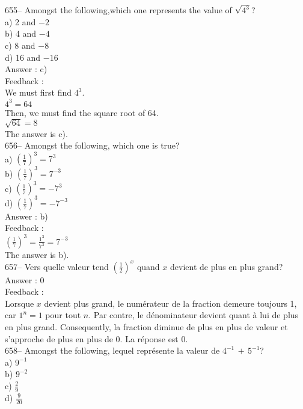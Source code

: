 \documentclass[letterpaper, 12pt]{article}
\begin{document}
655-- Amongst the following,which one represents the value of
$\sqrt{4^{3}}$?\\
a) 2 and $-2$\\
b) 4 and $-4$\\
c) 8 and $-8$\\
d) 16 and $-16$\\

Answer : c)\\

Feedback : \\
We must first find $4^{3}$.\\
$4^{3}=64$\\
Then, we must find the square root of 64.\\
$\sqrt{64}= 8$\\
The answer is c).\\

656-- Amongst the following, which one is true?\\
a) $(\frac{1}{7})^{3}=7^{3}$\\[2mm]
b) $(\frac{1}{7})^{3}=7^{-3}$\\[2mm]
c) $(\frac{1}{7})^{3}=-7^{3}$\\[2mm]
d) $(\frac{1}{7})^{3}=-7^{-3}$\\

Answer : b)\\

Feedback : \\[2mm]
$(\frac{1}{7})^{3}=\frac{1^{3}}{7^{3}}=7^{-3}$\\[2mm]
The answer is b).\\

657-- Vers quelle valeur tend $\left(\frac12\right)^x$ quand $x$
devient de plus
en plus grand?\\

Answer : 0\\

Feedback : \\
Lorsque $x$ devient plus grand, le num\'erateur de la fraction demeure
toujours 1, car $1^{n}=1$ pour tout $n$.  Par contre, le d\'enominateur
devient quant \`a lui de plus en plus grand.  Consequently, la fraction
diminue de plus en plus de valeur et s'approche de plus en plus de 0.  La
r\'eponse est 0.  \\

658-- Amongst the following, lequel repr\'esente la valeur de
$4^{-1}\,+\,5^{-1}$?\\
a) $9^{-1}$\\[2mm]
b) $9^{-2}$\\[2mm]
c) $\frac{2}{9}$\\[2mm]
d) $\frac{9}{20}$\\
\end{document}
